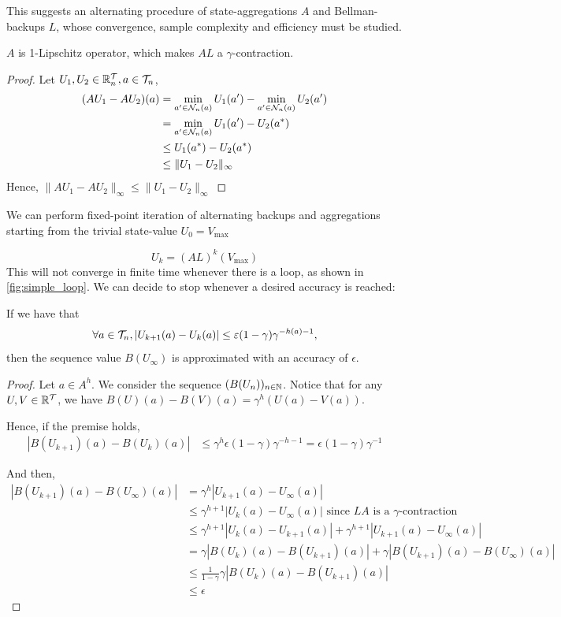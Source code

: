 \documentclass{article}
\begin{document}
This suggests an alternating procedure of state-aggregations $A$ and Bellman-backups $L$, whose convergence, sample complexity and efficiency must be studied.

\begin{theorem}[Contractivity of $AL$]
$A$ is 1-Lipschitz operator, which makes $AL$ a $\gamma$-contraction.
\end{theorem}
\begin{proof}
Let $U_1, U_2\in \mathbb{R}^{\mathcal{T}}_n, a\in\mathcal{T}_n$,
\begin{align*}
    (AU_1 - AU_2)(a) &= \min_{a'\in\mathcal{N}_n(a)} U_1(a') - \min_{a'\in\mathcal{N}_n(a)} U_2(a') \\
    &= \min_{a'\in\mathcal{N}_n(a)} U_1(a') - U_2(a^*) \\
    &\leq U_1(a^*) - U_2(a^*) \\
    &\leq \|U_1 - U_2\|_\infty
\end{align*}
Hence, $\|AU_1 - AU_2\|_\infty \leq \|U_1 - U_2\|_\infty$
\end{proof}

We can perform fixed-point iteration of alternating backups and aggregations starting from the trivial state-value $U_0 = V_{\max}$

\begin{equation}
    \label{eq:recursion}
    U_k = (AL)^k(V_{\max})
\end{equation}
This will not converge in finite time whenever there is a loop, as shown in \autoref{fig:simple_loop}. We can decide to stop whenever a desired accuracy is reached: 

\begin{proposition}
If we have that
\[\forall a\in\mathcal{T}_n, |U_{k+1}(a) - U_k(a)| \leq \varepsilon (1-\gamma)\gamma^{-h(a)-1},\]
then the sequence value $B(U_{\infty})$ is approximated with an accuracy of $\epsilon$.
\end{proposition}
\begin{proof}
Let $a\in A^h$. We consider the sequence $(B(U_n))_{n\in\mathbb{N}}$.
Notice that for any $U,V\in\mathbb{R}^{\mathcal{T}}$, we have $B(U)(a)-B(V)(a)=\gamma^h(U(a)-V(a))$.

Hence, if the premise holds,
\begin{align*}
    |B(U_{k+1})(a) - B(U_{k})(a)| &\leq \gamma^h\epsilon (1-\gamma)\gamma^{-h-1} = \epsilon (1-\gamma)\gamma^{-1}
\end{align*}

And then, 
\begin{align*}
|B(U_{k+1})(a) - B(U_\infty)(a)| &= \gamma^h |U_{k+1}(a) - U_\infty(a)|\\
&\leq \gamma^{h+1}|U_{k}(a) - U_\infty(a)| \text{ since $LA$ is a $\gamma$-contraction}\\
&\leq \gamma^{h+1}|U_{k}(a) - U_{k+1}(a)| + \gamma^{h+1}|U_{k+1}(a) - U_\infty(a)|\\
&= \gamma|B(U_{k})(a) - B(U_{k+1})(a)| + \gamma |B(U_{k+1})(a) - B(U_\infty)(a)|\\
&\leq \frac{1}{1-\gamma}\gamma |B(U_{k})(a) - B(U_{k+1})(a)|\\
&\leq\epsilon
\end{align*}

\end{proof}
\end{document}

